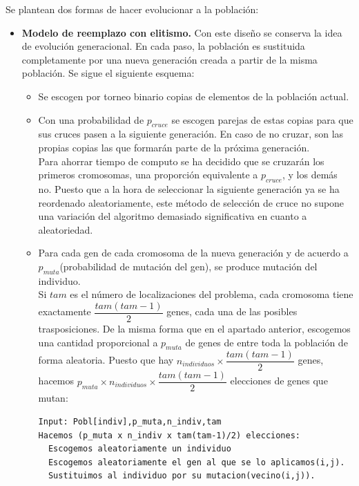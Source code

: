 Se plantean dos formas de hacer evolucionar a la población:\\

\begin{itemize}
	\item \textbf{Modelo de reemplazo con elitismo.} Con este diseño se conserva la idea de evolución generacional. En cada paso, la población es sustituida completamente por una nueva generación creada a partir de la misma población. Se sigue el siguiente esquema:\\
	
	\begin{itemize}
		\item Se escogen por torneo binario copias de elementos de la población actual.
		
		\item Con una probabilidad de $p_{cruce}$ se escogen parejas de estas copias para que sus cruces pasen a la siguiente generación. En caso de no cruzar, son las propias copias las que formarán parte de la próxima generación.\\
		
		Para ahorrar tiempo de computo se ha decidido que se cruzarán los primeros cromosomas, una proporción equivalente a $p_{cruce}$, y los demás no. Puesto que a la hora de seleccionar la siguiente generación ya se ha reordenado aleatoriamente, este método de selección de cruce no supone una variación del algoritmo demasiado significativa en cuanto a aleatoriedad.
		
		\item Para cada gen de cada cromosoma de la nueva generación y de acuerdo a $p_{muta}$(probabilidad de mutación del gen), se produce mutación del individuo.\\
		
		Si $tam$ es el número de localizaciones del problema, cada cromosoma tiene exactamente $\dfrac{tam(tam-1)}{2}$ genes, cada una de las posibles trasposiciones. De la misma forma que en el apartado anterior, escogemos una cantidad proporcional a $p_{muta}$ de genes de entre toda la población de forma aleatoria. Puesto que hay $n_{individuos}\times \dfrac{tam(tam-1)}{2}$ genes, hacemos $p_{muta}\times n_{individuos}\times \dfrac{tam(tam-1)}{2}$ elecciones de genes que mutan:
		
		\begin{lstlisting}
Input: Pobl[indiv],p_muta,n_indiv,tam
Hacemos (p_muta x n_indiv x tam(tam-1)/2) elecciones:
  Escogemos aleatoriamente un individuo
  Escogemos aleatoriamente el gen al que se lo aplicamos(i,j).
  Sustituimos al individuo por su mutacion(vecino(i,j)).
		\end{lstlisting}
		

\end{itemize}
\end{itemize}
